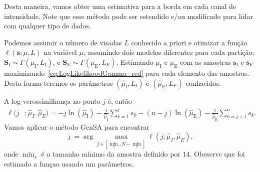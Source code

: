 Desta maneira, vamos obter uma estimativa para a borda em cada canal de intensidade.
Note que esse método pode ser estendido e/ou modificado para lidar com qualquer tipo de dados.

Podemos assumir o número de visadas $L$ conhecido a priori e otimizar a função $ \ell(\bm s;\mu, L)$ na variável $\mu$, assumindo dois modelos diferentes para cada partição:
$\bm S_\text{I} \sim \Gamma(\mu_\text{I},L_\text{I})$, e
$\bm S_\text{E} \sim \Gamma(\mu_\text{E},L_\text{E})$.
Estimando $\mu_\text{I}$ e $\mu_\text{E}$ com as amostras $\bm s_\text{I}$ e $\bm s_\text{E}$ maximizando~\eqref{eq:LogLikelihoodGamma_red} para cada elemento das amostras. Desta forma teremos os parâmetros $(\widehat{\mu}_\text{I}, L_\text{I})$ e $(\widehat{\mu}_\text{E}, L_\text{E})$ conhacidos.

A log-verossimilhança no ponto $j$ é, então
\begin{equation}\label{eq:TotalLogLikelihood_L_fixo}
\begin{split}
\ell(j&;\widehat{\mu}_I,\widehat{\mu}_E)= 
 -j\ln (\widehat{\mu}_\text{I}) 
- \frac{1}{\widehat{\mu}_\text{I}}\sum_{k=1}^{j} s_k -(n-j)\ln (\widehat{\mu}_\text{E})
- \frac{1}{\widehat{\mu}_\text{E}}\sum_{k=j+1}^{n} s_k.
\end{split}
\end{equation}
Vamos aplicar o método GenSA para encontrar
$$
\widehat{\jmath}= \arg\max\limits_{j\in [\min_s,N-\min_s]}\ell(j;\widehat{\mu}_I,\widehat{\mu}_E),
$$ 
onde $\min_s$ é o tamanho mínimo da amostra definido por $14$. Obeserve que foi estimado a funçao usando um parâmetros.